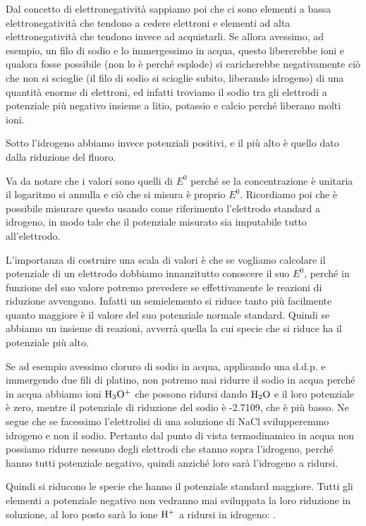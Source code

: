 Dal concetto di elettronegatività sappiamo poi che ci sono elementi a bassa elettronegatività che tendono a cedere elettroni e elementi ad alta elettronegatività che tendono invece ad acquistarli. Se allora avessimo, ad esempio, un filo di sodio e lo immergessimo in acqua, questo libererebbe ioni e qualora fosse possibile (non lo è perché esplode) si caricherebbe negativamente ciò che non si scioglie (il filo di sodio si scioglie subito, liberando idrogeno) di una quantità enorme di elettroni, ed infatti troviamo il sodio tra gli elettrodi a potenziale più negativo insieme a litio, potassio e calcio perché liberano molti ioni.

Sotto l'idrogeno abbiamo invece potenziali positivi, e il più alto è quello dato dalla riduzione del fluoro.

Va da notare che i valori sono quelli di $E^0$ perché se la concentrazione è unitaria il logaritmo si annulla e ciò che si misura è proprio $E^0$. Ricordiamo poi che è possibile misurare questo usando come riferimento l'elettrodo standard a idrogeno, in modo tale che il potenziale misurato sia imputabile tutto all'elettrodo.

L'importanza di costruire una scala di valori è che se vogliamo calcolare il potenziale di un elettrodo dobbiamo innanzitutto conoscere il suo $E^0$, perché in funzione del suo valore potremo prevedere se effettivamente le reazioni di riduzione avvengono. Infatti un semielemento si riduce tanto più facilmente quanto maggiore è il valore del suo potenziale normale standard. Quindi se abbiamo un insieme di reazioni, avverrà quella la cui specie che si riduce ha il potenziale più alto.

Se ad esempio avessimo cloruro di sodio in acqua, applicando una d.d.p. e immergendo due fili di platino, non potremo mai ridurre il sodio in acqua perché in acqua abbiamo ioni $\rm H_3O^+$ che possono ridursi dando $\rm H_2O$ e il loro potenziale è zero, mentre il potenziale di riduzione del sodio è -2.7109, che è più basso. Ne segue che se facessimo l'elettrolisi di una soluzione di NaCl svilupperemmo idrogeno e non il sodio. Pertanto dal punto di vista termodinamico in acqua non possiamo ridurre nessuno degli elettrodi che stanno sopra l'idrogeno, perché hanno tutti potenziale negativo, quindi anziché loro sarà l'idrogeno a ridursi.

\vspace{0.2cm}Quindi si riducono le specie che hanno il potenziale standard maggiore. Tutti gli elementi a potenziale negativo non vedranno mai sviluppata la loro riduzione in soluzione, al loro posto sarà lo ione $\rm H^+$ a ridursi in idrogeno: .

